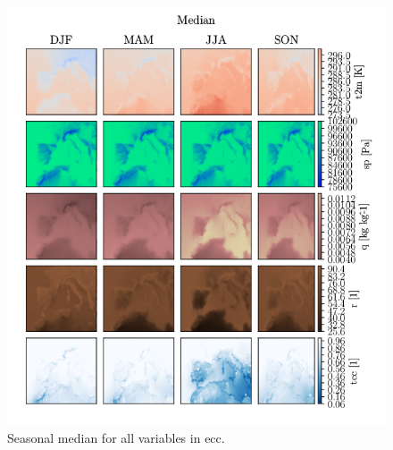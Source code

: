 \begin{figure}[ht]
    \centering
    \includegraphics{python_figs/seasonal_median_all_variables.png}
    \caption{Seasonal median for all variables in \acrshort{ecc}.}
    \label{fig:seasonal_median}
\end{figure}

\cleardoublepage
